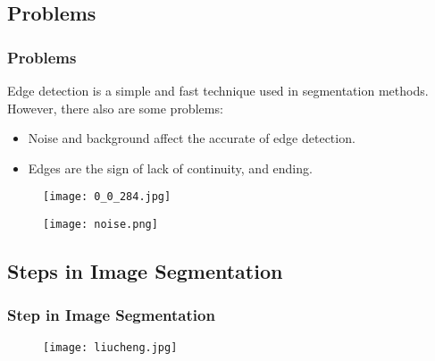 \documentclass[notheorems,serif,table,compress]{beamer}  %
\begin{document}
\subsection{Problems}
\begin{frame}
\frametitle{Problems}
Edge detection is a simple and fast technique used in segmentation methods. However, there also are some problems:
    \begin{itemize}
    \item Noise and background affect the accurate of edge detection.
    \item {\color{blue}Edges are the sign of lack of continuity, and ending.}
    \end{itemize}
    \begin{figure}
    \begin{minipage}[t]{0.4\linewidth}
    \centering
    \texttt{[image: 0\_0\_284.jpg]} 
    \end{minipage}
    \begin{minipage}[t]{0.4\linewidth}
    \centering
    \texttt{[image: noise.png]} 
    \end{minipage}
    \end{figure}
\end{frame}

\subsection{Steps in Image Segmentation}
\begin{frame}
\frametitle{Step in Image Segmentation}
    \begin{figure}
    \texttt{[image: liucheng.jpg]} 
    \end{figure}
\end{frame}



\begin{comment}
\section{边缘检测}

\begin{frame}
\frametitle{边缘检测方法}
\begin{itemize}
\item Roberts算子
\item Sobel算子
\item Prewitt算子
\item Kirsch算子
\item Marr-Hildreth 边缘检测
\item LoG算子
\item Canny算子
\end{itemize}
\end{frame}
\end{comment}
\end{document}
